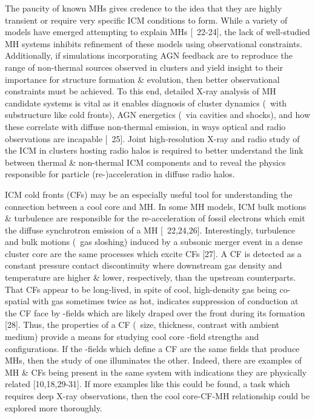 \documentclass[letterpaper,11pt]{article}
\begin{document}
The paucity of known MHs gives credence to the idea that they are
highly transient or require very specific ICM conditions to
form. While a variety of models have emerged attempting to explain MHs
[\eg\ 22-24], the lack of well-studied MH systems inhibits refinement
of these models using observational constraints. Additionally, if
simulations incorporating AGN feedback are to reproduce the range of
non-thermal sources observed in clusters and yield insight to their
importance for structure formation \& evolution, then better
observational constraints must be achieved. To this end, detailed
X-ray analysis of MH candidate systems is vital as it enables
diagnosis of cluster dynamics (\eg\ with substructure like cold
fronts), AGN energetics (\eg\ via cavities and shocks), and how these
correlate with diffuse non-thermal emission, in ways optical and radio
observations are incapable [\eg\ 25]. Joint high-resolution X-ray and
radio study of the ICM in clusters hosting radio halos is required to
better understand the link between thermal \& non-thermal ICM
components and to reveal the physics responsible for particle
(re-)acceleration in diffuse radio halos.

ICM cold fronts (CFs) may be an especially useful tool for
understanding the connection between a cool core and MH. In some MH
models, ICM bulk motions \& turbulence are responsible for the
re-acceleration of fossil electrons which emit the diffuse synchrotron
emission of a MH [\eg\ 22,24,26]. Interestingly, turbulence and bulk
motions (\eg\ gas sloshing) induced by a subsonic merger event in a
dense cluster core are the same processes which excite CFs [27]. A CF
is detected as a constant pressure contact discontinuity where
downstream gas density and temperature are higher \& lower,
respectively, than the upstream counterparts. That CFs appear to be
long-lived, in spite of cool, high-density gas being co-spatial with
gas sometimes twice as hot, indicates suppression of conduction at the
CF face by \bmag-fields which are likely draped over the front during
its formation [28]. Thus, the properties of a CF (\ie\ size,
thickness, contrast with ambient medium) provide a means for studying
cool core \bmag-field strengths and configurations. If the
\bmag-fields which define a CF are the same fields that produce MHs,
then the study of one illuminates the other. Indeed, there are
examples of MH \& CFs being present in the same system with
indications they are physically related [10,18,29-31]. If more
examples like this could be found, a task which requires deep X-ray
observations, then the cool core-CF-MH relationship could be explored
more thoroughly.\vspace{5.5pt}
\end{document}
